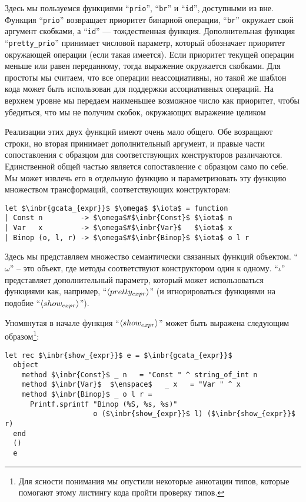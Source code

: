 Здесь мы пользуемся функциями ``\lstinline{prio}'', ``\lstinline{br}'' и ``\lstinline{id}'', доступными из вне. Функция ``\lstinline{prio}''
возвращает приоритет бинарной операции, ``\lstinline{br}'' окружает свой аргумент скобками, а ``\lstinline{id}'' --- тождественная функция.
Дополнительная функция ``\lstinline{pretty_prio}'' принимает числовой параметр, который обозначает приоритет окружающей операции (если такая имеется). Если приоритет текущей операции меньше или равен переданному, тогда выражение окружается скобками. Для простоты мы считаем, что все операции неассоциативны, но такой же шаблон кода может быть использован для поддержки ассоциативных операций.
На верхнем уровне мы передаем наименьшее возможное число как приоритет, чтобы убедиться, что мы не получим скобок, окружающих выражение целиком 

Реализации этих двух функций имеют очень мало общего. Обе возращают строки, но вторая принимает дополнительный аргумент, и 
правые части сопоставления с образцом для соответствующих конструкторов различаются. Единственной общей частью является
сопоставление с образцом само по себе. Мы может извлечь его в отдельную функцию и параметризовать эту функцию множеством трансформаций, 
соответствующих конструкторам:

\begin{lstlisting}
let $\inbr{gcata_{expr}}$ $\omega$ $\iota$ = function
| Const n         -> $\omega$#$\inbr{Const}$ $\iota$ n
| Var   x         -> $\omega$#$\inbr{Var}$   $\iota$ x
| Binop (o, l, r) -> $\omega$#$\inbr{Binop}$ $\iota$ o l r
\end{lstlisting}

Здесь мы представляем множество семантически связанных функций объектом. ``$\omega$'' -- это объект, где методы соответствуют конструктором
один к одному. ``$\iota$'' представляет дополнительный параметр, который может использоваться функциями как, например, ``$\left<pretty_{expr}\right>$'' (и игнорироваться функциями на подобие ``$\left<show_{expr}\right>$'').

Упомянутая в начале функция ``$\left<show_{expr}\right>$'' может быть выражена следующим образом\footnote{Для ясности понимания мы опустили некоторые аннотации типов, которые помогают этому листингу кода пройти проверку типов.}:

\begin{lstlisting}
let rec $\inbr{show_{expr}}$ e = $\inbr{gcata_{expr}}$
  object
    method $\inbr{Const}$ _ n   = "Const " ^ string_of_int n
    method $\inbr{Var}$  $\enspace$   _ x   = "Var " ^ x
    method $\inbr{Binop}$ _ o l r =
      Printf.sprintf "Binop (%S, %s, %s)" 
                     o ($\inbr{show_{expr}}$ l) ($\inbr{show_{expr}}$ r)
  end
  ()
  e
\end{lstlisting}

